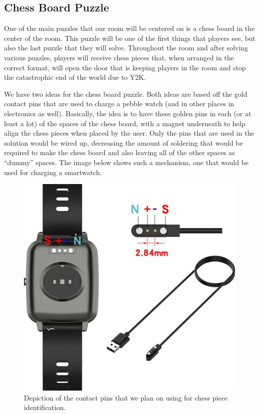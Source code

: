 \documentclass[conference]{IEEEtran}
\begin{document}
\subsection{Chess Board Puzzle}
One of the main puzzles that our room will be centered on is a chess board in the center of the room.
This puzzle will be one of the first things that players see, but also the last puzzle that they will solve.
Throughout the room and after solving various puzzles, players will receive chess pieces that, when
arranged in the correct format, will open the door that is keeping players in the room and stop the
catastrophic end of the world due to Y2K.

We have two ideas for the chess board puzzle. Both ideas are based off the gold contact pins that are used
to charge a pebble watch (and in other places in electronics as well). Basically, the idea
is to have these golden pins in each (or at least a lot) of the spaces of the chess board, with
a magnet underneath to help align the chess pieces when placed by the user. Only the pins that are used in
the solution would be wired up, decreasing the amount of soldering that would be required to make the chess
board and also leaving all of the other spaces as ``dummy'' spaces. The image below shows such a
mechanism, one that would be used for charging a smartwatch.

\begin{figure}[ht]
    \centering
    \includegraphics[width=0.75\columnwidth]{Images/pebble charger.jpg}
    \caption{Depiction of the contact pins that we plan on using for chess piece identification.}
\end{figure}
\end{document}
